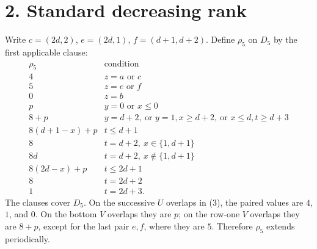 \documentclass[11pt]{article}
\begin{document}
\section*{2. Standard decreasing rank}
Write $c=(2d,2)$, $e=(2d,1)$, $f=(d+1,d+2)$. Define $\rho_5$ on $D_5$
by the first applicable clause:
\[
\begin{array}{c|l}
\rho_5&\text{condition}\\\hline
4&z=a\text{ or }c\\
5&z=e\text{ or }f\\
0&z=b\\
p&y=0\text{ or }x\le0\\
8+p&y=d+2,\ \text{or }y=1,x\ge d+2,\ \text{or }x\le d,t\ge d+3\\
8(d+1-x)+p&t\le d+1\\
8&t=d+2,\ x\in\{1,d+1\}\\
8d&t=d+2,\ x\notin\{1,d+1\}\\
8(2d-x)+p&t\le2d+1\\
8&t=2d+2\\
1&t=2d+3.
\end{array}                                                    \tag{5}
\]
The clauses cover $D_5$. On the successive $U$ overlaps in (3), the
paired values are $4$, $1$, and $0$. On the bottom $V$ overlaps they
are $p$; on the row-one $V$ overlaps they are $8+p$, except for the last
pair $e,f$, where they are $5$. Therefore $\rho_5$ extends periodically.
\end{document}
